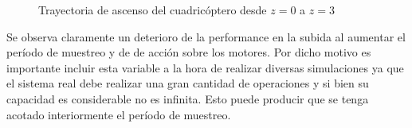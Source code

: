 \documentclass[main]{subfiles}
\begin{document}
\begin{figure} [h!]
  \centering
  \caption{Trayectoria de ascenso del cuadric\'optero desde $z=0$ a $z=3$}
  \label{fig:t_muestreo}
\end{figure} 
 
Se observa claramente un deterioro de la performance en la subida al aumentar el per\'iodo de muestreo y de de acci\'on sobre los motores. Por dicho motivo es importante incluir esta variable a la hora de realizar diversas simulaciones ya que el sistema real debe realizar una gran cantidad de operaciones y si bien su capacidad es considerable no es infinita. Esto puede producir que se tenga acotado interiormente el per\'iodo de muestreo.\\
\end{document}
